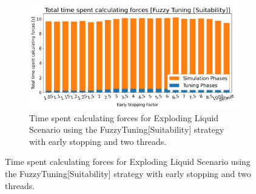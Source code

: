 \documentclass[conference]{IEEEtran}
\begin{document}
\begin{figure}[h]
\begin{subfigure}[b]{\columnwidth}
        \includegraphics[width=\columnwidth]{../data/explodingLiquid/cluster/fuzzyTuningEvidenceBased_2threads/analytics/total_time_average.png}

        \caption{Time spent calculating forces for Exploding Liquid Scenario using the FuzzyTuning[Suitability] strategy with early stopping and two threads.}
        \label{fig:fuzzy_tuning}
    \end{subfigure}
\end{figure}
\end{document}
